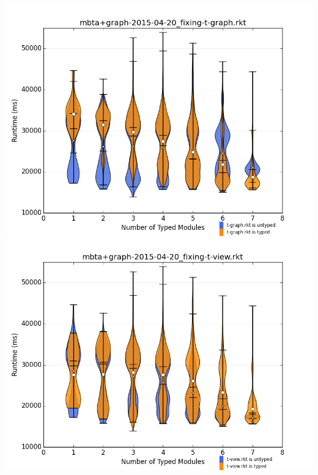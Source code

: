 \documentclass{article}
\begin{document}
\includegraphics[width=\textwidth]{mbta+graph-2015-04-20_fixing-t-graph.rkt-dv.png}
\includegraphics[width=\textwidth]{mbta+graph-2015-04-20_fixing-t-view.rkt-dv.png}
\end{document}
